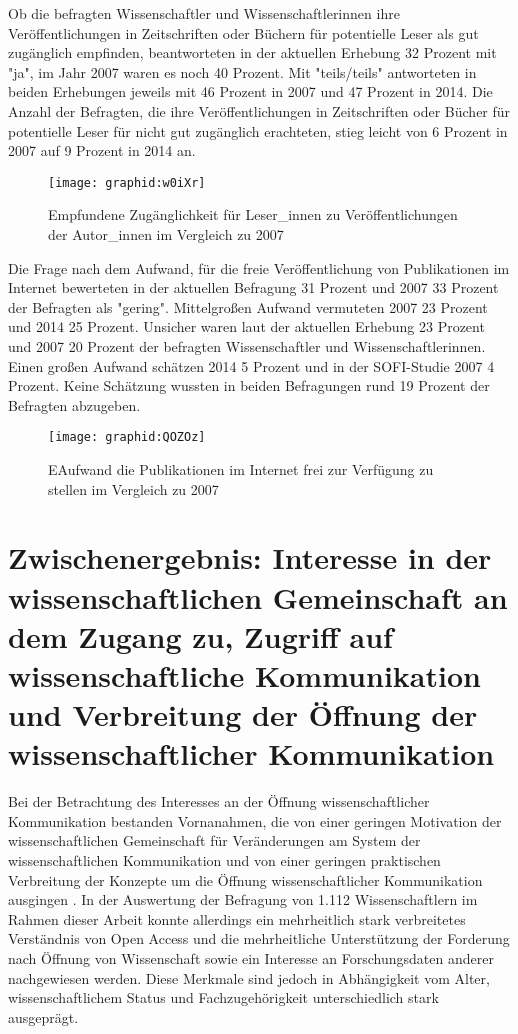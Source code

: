 Ob die befragten Wissenschaftler und Wissenschaftlerinnen ihre Veröffentlichungen in Zeitschriften oder Büchern für potentielle Leser als gut zugänglich empfinden, beantworteten in der aktuellen Erhebung 32 Prozent mit "ja", im Jahr 2007 waren es noch 40 Prozent. Mit "teils/teils" antworteten in beiden Erhebungen jeweils mit 46 Prozent in 2007 und 47 Prozent in 2014. Die Anzahl der Befragten, die ihre Veröffentlichungen in Zeitschriften oder Bücher für potentielle Leser für nicht gut zugänglich erachteten, stieg leicht von 6 Prozent in 2007 auf 9 Prozent in 2014 an.

\begin{figure}[h!]
\texttt{[image: graphid:w0iXr]}
\caption{Empfundene Zugänglichkeit für Leser_innen zu Veröffentlichungen der Autor_innen im Vergleich zu 2007}
\end{figure}

Die Frage nach dem Aufwand, für die freie Veröffentlichung von Publikationen im Internet bewerteten in der aktuellen Befragung 31 Prozent und 2007 33 Prozent der Befragten als "gering". Mittelgroßen Aufwand vermuteten 2007 23 Prozent und 2014 25 Prozent. Unsicher waren laut der aktuellen Erhebung 23 Prozent und 2007 20 Prozent der befragten Wissenschaftler und Wissenschaftlerinnen. Einen großen Aufwand schätzen 2014 5 Prozent und in der SOFI-Studie 2007 4 Prozent. Keine Schätzung wussten in beiden Befragungen rund 19 Prozent der Befragten abzugeben.

\begin{figure}[h!]
\texttt{[image: graphid:QOZOz]}
\caption{EAufwand die Publikationen im Internet frei zur Verfügung zu stellen im Vergleich zu 2007}
\end{figure}

\section{Zwischenergebnis: Interesse in der wissenschaftlichen Gemeinschaft an dem Zugang zu, Zugriff auf wissenschaftliche Kommunikation und Verbreitung der Öffnung der wissenschaftlicher Kommunikation}

Bei der Betrachtung des Interesses an der Öffnung wissenschaftlicher Kommunikation bestanden Vornanahmen, die von einer geringen Motivation der wissenschaftlichen Gemeinschaft für Veränderungen am System der wissenschaftlichen Kommunikation \cite{hagner_2015_sache_buches} und von einer geringen praktischen Verbreitung der Konzepte um die Öffnung wissenschaftlicher Kommunikation ausgingen \cite{Scheliga_2014}. In der Auswertung der Befragung von 1.112 Wissenschaftlern im Rahmen dieser Arbeit konnte allerdings ein mehrheitlich stark verbreitetes Verständnis von Open Access und die mehrheitliche Unterstützung der Forderung nach Öffnung von Wissenschaft sowie ein Interesse an Forschungsdaten anderer nachgewiesen werden. Diese Merkmale sind jedoch in Abhängigkeit vom Alter, wissenschaftlichem Status und Fachzugehörigkeit unterschiedlich stark ausgeprägt.

